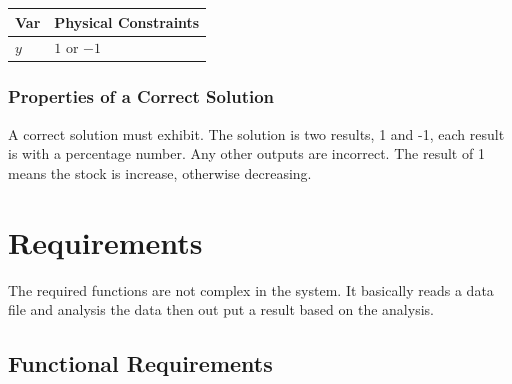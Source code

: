 \documentclass[12pt]{article}
\begin{document}
\begin{table}[!h]
\caption{Output Variables} \label{TblOutputVar}
\renewcommand{\arraystretch}{1.2}
\noindent \begin{longtable*}{l l} 
\toprule
\textbf{Var} & \textbf{Physical Constraints} \\
\midrule 
$y$ & $1$ or $-1$ 
\\
\bottomrule
\end{longtable*}
\end{table}

\subsubsection{Properties of a Correct Solution} \label{sec_CorrectSolution}

\noindent
A correct solution must exhibit. The solution is two results, 1 and -1, each result is with a percentage number. Any other outputs are incorrect. The result of 1 means the stock is increase, otherwise decreasing.

\section{Requirements}

The required functions are not complex in the system. It basically reads a data file and analysis the data then out put a result based on the analysis. 

\subsection{Functional Requirements}
\end{document}
